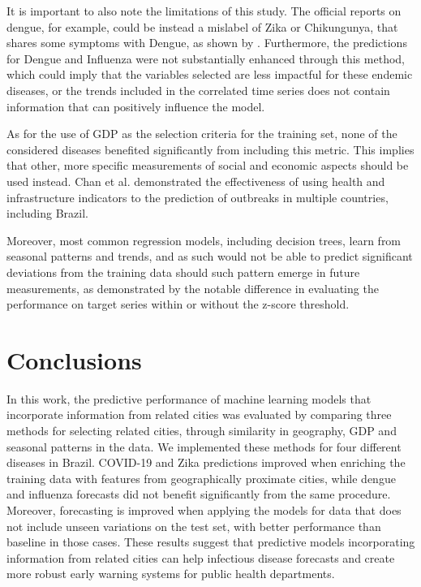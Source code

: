 It is important to also note the limitations of this study. The official reports on dengue, for example, could be instead a mislabel of Zika or Chikungunya, that shares some symptoms with Dengue, as shown by \cite{Pessa2016InvestigationIA}. Furthermore, the predictions for Dengue and Influenza were not substantially enhanced through this method, which could imply that the variables selected are less impactful for these endemic diseases, or the trends included in the correlated time series does not contain information that can positively influence the model. 

As for the use of GDP as the selection criteria for the training set, none of the considered diseases benefited significantly from including this metric. This implies that 
other, more specific measurements of social and economic aspects should be used instead. Chan et al. \cite{Chan2013Feb} demonstrated the effectiveness of using health and infrastructure indicators to the prediction of outbreaks in multiple countries, including Brazil.

Moreover, most common regression models, including decision trees, learn from seasonal patterns and trends, and as such would not be able to predict significant deviations from the training data should such pattern emerge in future measurements, as demonstrated by the notable difference in evaluating the performance on target series within or without the z-score threshold. 


\section{Conclusions}
\label{sec:conclusion}
In this work, the predictive performance of machine learning models that incorporate information from related cities was evaluated by comparing three methods for selecting related cities, through similarity in geography, GDP and seasonal patterns in the data. We implemented these methods for four different diseases in Brazil. COVID-19 and Zika predictions improved when enriching the training data with features from geographically proximate cities, while dengue and influenza forecasts did not benefit significantly from the same procedure. Moreover, forecasting is improved when applying the models for data that does not include unseen variations on the test set, with better performance than baseline in those cases. These results suggest that predictive models incorporating information from related cities can help infectious disease forecasts and create more robust early warning systems for public health departments. 


